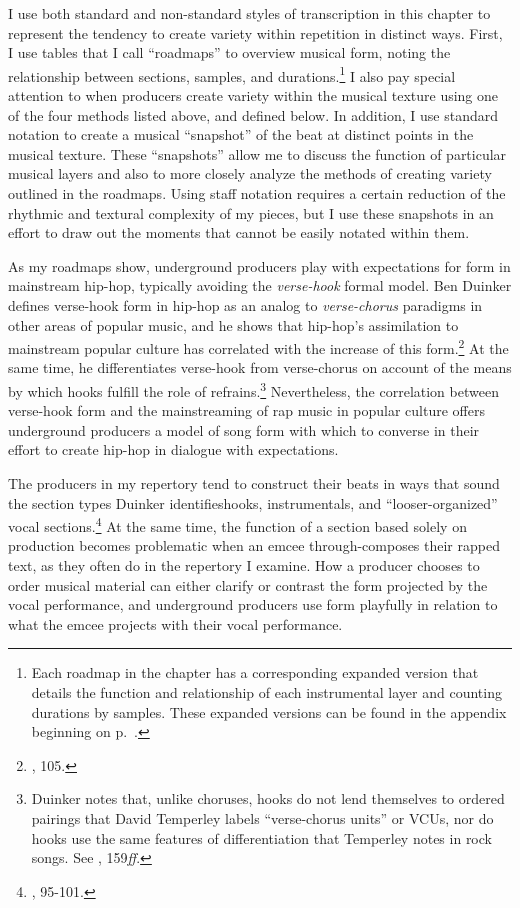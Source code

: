 I use both standard and non-standard styles of transcription in this chapter to represent the tendency to create variety within repetition in distinct ways. First, I use tables that I call ``roadmaps'' to overview musical form, noting the relationship between sections, samples, and durations.\footnote{Each roadmap in the chapter has a corresponding expanded version that details the function and relationship of each instrumental layer and counting durations by samples. These expanded versions can be found in the appendix beginning on p.~\pageref{appendix:fullroadmaps}.} I also pay special attention to when producers create variety within the musical texture using one of the four methods listed above, and defined below. In addition, I use standard notation to create a musical ``snapshot'' of the beat at distinct points in the musical texture. These ``snapshots'' allow me to discuss the function of particular musical layers and also to more closely analyze the methods of creating variety outlined in the roadmaps. Using staff notation requires a certain reduction of the rhythmic and textural complexity of my pieces, but I use these snapshots in an effort to draw out the moments that cannot be easily notated within them.

As my roadmaps show, underground producers play with expectations for form in mainstream hip-hop, typically avoiding the \emph{verse-hook} formal model. Ben Duinker defines verse-hook form in hip-hop as an analog to \emph{verse-chorus} paradigms in other areas of popular music, and he shows that hip-hop's assimilation to mainstream popular culture has correlated with the increase of this form.\footnote{\cite{benduinkerSongFormMainstreaming2020}, 105.} At the same time, he differentiates verse-hook from verse-chorus on account of the means by which hooks fulfill the role of refrains.\footnote{Duinker notes that, unlike choruses, hooks do not lend themselves to ordered pairings that David Temperley labels ``verse-chorus units'' or VCUs, nor do hooks use the same features of differentiation that Temperley notes in rock songs. See \cite{davidtemperleyMusicalLanguageRock2018}, 159\textit{ff}.} Nevertheless, the correlation between verse-hook form and the mainstreaming of rap music in popular culture offers underground producers a model of song form with which to converse in their effort to create hip-hop in dialogue with expectations.

The producers in my repertory tend to construct their beats in ways that sound the section types Duinker identifies\textemdash  hooks, instrumentals, and ``looser-organized'' vocal sections.\footnote{\cite{benduinkerSongFormMainstreaming2020}, 95-101.} At the same time, the function of a section based solely on production becomes problematic when an emcee through-composes their rapped text, as they often do in the repertory I examine. How a producer chooses to order musical material can either clarify or contrast the form projected by the vocal performance, and underground producers use form playfully in relation to what the emcee projects with their vocal performance.

